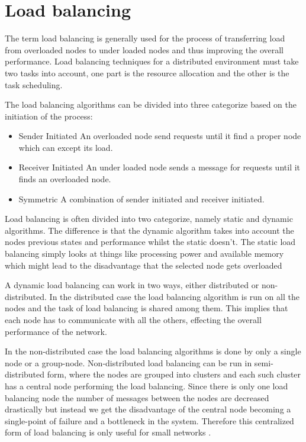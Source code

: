 \documentclass{cslthse-msc}
\begin{document}
\section{Load balancing}
The term load balancing is generally used for the process of transferring load from overloaded nodes to under loaded nodes and thus improving the overall performance. Load balancing techniques for a distributed environment must take two tasks into account, one part is the resource allocation and the other is the task scheduling. 

The load balancing algorithms can be divided into three categorize based on the initiation of the process:
\begin{itemize}
\item Sender Initiated An overloaded node send requests until it find a proper node which can except its load.
\item Receiver Initiated An under loaded node sends a message for requests until it finds an overloaded node.
\item Symmetric A combination of sender initiated and receiver initiated. 
\end{itemize}

Load balancing is often divided into two categorize, namely static and dynamic algorithms. The difference is that the dynamic algorithm takes into account the nodes previous states and performance whilst the static doesn't. The static load balancing simply looks at things like processing power and available memory which might lead to the disadvantage that the selected node gets overloaded \cite{perfAnalysisLoadCloud}

A dynamic load balancing can work in two ways, either distributed or non-distributed. In the distributed case the load balancing algorithm is run on all the nodes and the task of load  balancing is shared among them. This implies that each node has to communicate with all the others, effecting the overall performance of the network. %

In the non-distributed case the load balancing algorithms is done by only a single node or a group-node. Non-distributed load balancing can be run in semi-distributed form, where the nodes are grouped into clusters and each such cluster has a central node performing the load balancing. Since there is only one load balancing node the number of messages between the nodes are decreased drastically but instead we get the disadvantage of the central node becoming a single-point of failure and a bottleneck in the system. Therefore this centralized form of load balancing is only useful for small networks \cite{perfAnalysisLoadCloud}.
\end{document}

